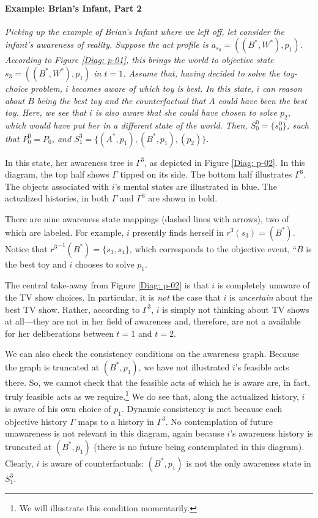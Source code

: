 \documentclass[
11pt,
titlepage,
reqno,
]{article}%
\theoremstyle{definition}
\begin{document}
\paragraph{Example: Brian's Infant, Part 2}	
{\em
Picking up the example of Brian's Infant where we left off, let consider the infant's awareness of reality.
Suppose the act profile is $a_{s_0}=((B^\ast,W^\ast),p_1)$.
According to Figure \ref{Diag: p-01}, this brings the world to objective state $s_{3}=((B^\ast,W^\ast),p_1)$ in  $t=1$.
Assume that, having decided to solve the toy-choice problem, $i$ becomes aware of which toy is best.
In this state, $i$ can reason about $B$ being the best toy and the counterfactual that $A$ could have been the best toy.
Here, we see that $i$ is also aware that she could have chosen to solve $p_2$, which would have put her in a different state of the world. 
Then, $S^{0}_0=\{s^0_0\}$, such that $P^0_0=P_0$, and  $S^{3}_1=\{(A^\ast,p_1),(B^\ast,p_1),(p_2)\}$.

In this state, her awareness tree is $\Gamma^{3}$, as depicted in Figure \ref{Diag: p-02}.
In this diagram, the top half shows $\Gamma$ tipped on its side. 
The bottom half illustrates $\Gamma^{3}$.
The objects associated with $i$'s mental states are illustrated in blue.
The actualized histories, in both $\Gamma$ and $\Gamma^{3}$ are shown in bold.

There are nine awareness state mappings (dashed lines with arrows), two of which are labeled.
For example, $i$ presently finds herself in $r^{3}(s_{3})=(B^\ast)$.
Notice that ${r^{3}}^{-1}(B^\ast)=\{s_{3},s_{4}\}$, which corresponds to the objective event, ``$B$ is the best toy and $i$ chooses to solve $p_1$.

The central take-away from Figure \ref{Diag: p-02} is that $i$ is completely unaware of the TV show choices.
In particular, it is \textit{not} the case that $i$ is \textit{uncertain} about the best TV show.
Rather, according to $\Gamma^{3}$, $i$ is simply not thinking about TV shows at all---they are not in her field of awareness and, therefore, are not a available for her deliberations between $t=1$ and $t=2$.

We can also check the consistency conditions on the awareness graph. 
Because the graph is truncated at $(B^\ast,p_1)$, we have not illustrated $i$'s feasible acts there. 
So, we cannot check that the feasible acts of which he is aware are, in fact, truly feasible acts as we require.\footnote
{
	We will illustrate this condition momentarily. 
}
We do see that, along the actualized history, $i$ is aware of his own choice of $p_1$.
Dynamic consistency is met because each objective history $\Gamma$ maps to a history in $\Gamma^{3}$.
No contemplation of future unawareness is not relevant in this diagram, again because $i$'s awareness history is truncated at $(B^\ast,p_1)$ (there is no future being contemplated in this diagram). 
Clearly, $i$ is aware of counterfactuals:  $(B^\ast,p_1)$ is not the only awareness state in $S^{3}_1$.

}
\end{document}
